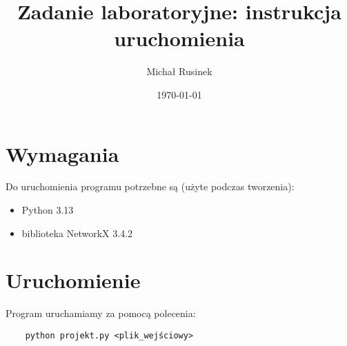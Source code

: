 \documentclass[a4paper, 12pt]{article}
\title{Zadanie laboratoryjne: instrukcja uruchomienia}
\author{Michał Rusinek}
\date{\today}
\begin{document}
\maketitle
\thispagestyle{empty}
\newpage

\section{Wymagania}
Do uruchomienia programu potrzebne są (użyte podczas tworzenia):
\begin{itemize}
    \item Python 3.13
    \item biblioteka NetworkX 3.4.2
\end{itemize}

\section{Uruchomienie}
Program uruchamiamy za pomocą polecenia:
\begin{verbatim}
    python projekt.py <plik_wejściowy>
\end{verbatim}
\end{document}

